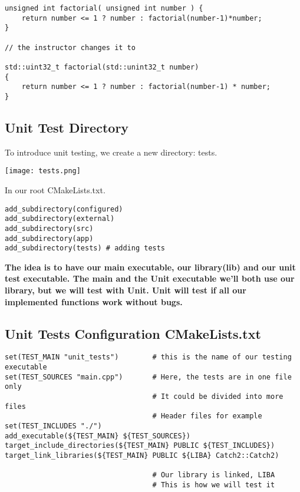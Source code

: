 \begin{verbatim}
unsigned int factorial( unsigned int number ) {
    return number <= 1 ? number : factorial(number-1)*number;
}

// the instructor changes it to

std::uint32_t factorial(std::unint32_t number)
{
    return number <= 1 ? number : factorial(number-1) * number;
}
\end{verbatim}

\subsection{Unit Test Directory}

To introduce unit testing, we create a new directory: tests.

\begin{center}
    \texttt{[image: tests.png]}
\end{center}

In our root CMakeLists.txt.  

\begin{verbatim}
add_subdirectory(configured)
add_subdirectory(external)
add_subdirectory(src)
add_subdirectory(app)
add_subdirectory(tests) # adding tests
\end{verbatim}

\textbf{The idea is to have our main executable, our library(lib) and our unit test executable. The main and the Unit
executable we'll both use our library, but we will test with Unit. Unit will test if all our implemented functions work without bugs.}


\subsection{Unit Tests Configuration CMakeLists.txt}

\begin{verbatim}
set(TEST_MAIN "unit_tests")        # this is the name of our testing executable
set(TEST_SOURCES "main.cpp")       # Here, the tests are in one file only
                                   # It could be divided into more files
                                   # Header files for example
set(TEST_INCLUDES "./")
add_executable(${TEST_MAIN} ${TEST_SOURCES})
target_include_directories(${TEST_MAIN} PUBLIC ${TEST_INCLUDES})
target_link_libraries(${TEST_MAIN} PUBLIC ${LIBA} Catch2::Catch2)

                                   # Our library is linked, LIBA
                                   # This is how we will test it
\end{verbatim}


